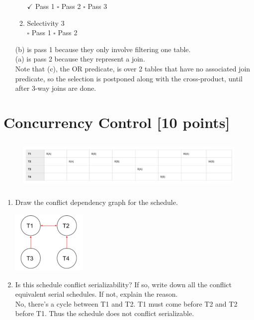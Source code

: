 \documentclass[10pt]{article}
\begin{document}
\begin{enumerate}
\begin{enumerate}
        {\color{red}$\checkmark$ Pass 1} \quad $\square$ Pass 2 \quad $\square$ Pass 3
        \item Selectivity 3 \\
        $\square$ Pass 1 \quad $\square$ Pass 2 
    \end{enumerate}
    {\color{red} (b) is pass 1 because they only involve filtering one table. \\
    (a) is pass 2 because they represent a join. \\
    Note that (c), the OR predicate, is over 2 tables that have no associated join predicate, so the selection is postponed along with the cross-product, until after 3-way joins are done.}
\end{enumerate}




\section{ \textbf{Concurrency Control  [10 points]}}
\begin{figure}[h]\centering\includegraphics[height=2.5cm]{conflict.png}\end{figure}
\begin{enumerate}
    \item[(a)] [6 points] Draw the conflict dependency graph for the schedule.\\
\begin{center}
    \includegraphics[height=3cm]{conflict_sol.png}
\end{center}
    \item[(b)] [4 points] Is this schedule conflict serializability? If so, write down all the conflict equivalent serial schedules. If not, explain the reason. \\
    {\color{red}  No, there's a cycle between T1 and T2. T1 must come before T2 and T2 before T1. Thus the schedule does not conflict serializable.}
\end{enumerate}
\end{document}
